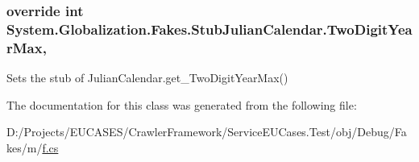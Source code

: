 \hypertarget{class_system_1_1_globalization_1_1_fakes_1_1_stub_julian_calendar_abbbf0aaee51fdf8528c0ef17313ba54c}{
\subsubsection[{Two\-Digit\-Year\-Max}]{\setlength{\rightskip}{0pt plus 5cm}override int System.\-Globalization.\-Fakes.\-Stub\-Julian\-Calendar.\-Two\-Digit\-Year\-Max\hspace{0.3cm}{\ttfamily [get]}, {\ttfamily [set]}}}\label{class_system_1_1_globalization_1_1_fakes_1_1_stub_julian_calendar_abbbf0aaee51fdf8528c0ef17313ba54c}


Sets the stub of Julian\-Calendar.\-get\-\_\-\-Two\-Digit\-Year\-Max()



The documentation for this class was generated from the following file\-:\begin{DoxyCompactItemize}
\item 
D\-:/\-Projects/\-E\-U\-C\-A\-S\-E\-S/\-Crawler\-Framework/\-Service\-E\-U\-Cases.\-Test/obj/\-Debug/\-Fakes/m/\hyperlink{m_2f_8cs}{f.\-cs}\end{DoxyCompactItemize}
